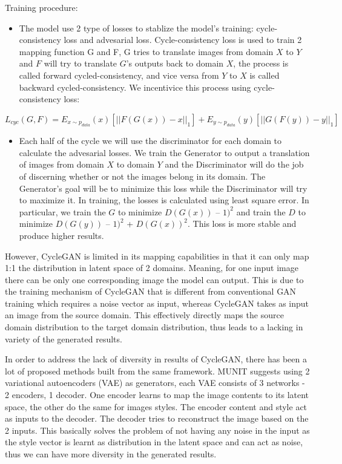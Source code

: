 \documentclass[12pt]{report}
\begin{document}
Training procedure:
\begin{itemize}
	\item The model use 2 type of losses to stablize the model’s training: cycle-consistency loss and advesarial loss. Cycle-consistency loss is used to train 2 mapping function G and F, G tries to translate images from domain $X$ to $Y$ and $F$ will try to translate $G$’s outputs back to domain $X$, the process is called forward cycled-consistency, and vice versa from $Y$ to $X$ is called backward cycled-consistency. We incentivice this process using cycle-consistency loss:
\end{itemize}
\[L_{cyc}(G, F) = E_{x \sim p_{data}}(x)[||F(G(x)) - x||_1] + E_{y \sim p_{data}}(y)[||G(F(y)) - y||_1]\]
\begin{itemize}
	\item Each half of the cycle we will use the discriminator for each domain to calculate the advesarial losses. We train the Generator to output a translation of images from domain $X$ to domain $Y$ and the Discriminator will do the job of discerning whether or not the images belong in its domain. The Generator’s goal will be to minimize this loss while the Discriminator will try to maximize it. In training, the losses is calculated using least square error. In particular, we train the $G$ to minimize $D(G(x))$ – $1)^2$ and train the $D$ to minimize $D(G(y))$ – $1)^2$ + $D(G(x))^2$. This loss is more stable and produce higher results.
\end{itemize}

However, CycleGAN is limited in its mapping capabilities in that it can only map 1:1 the distribution in latent space of 2 domains. Meaning, for one input image there can be only one corresponding image the model can output. This is due to the training mechanism of CycleGAN that is different from conventional GAN training which requires a noise vector as input, whereas CycleGAN takes as input an image from the source domain. This effectively directly maps the source domain distribution to the target domain distribution, thus leads to a lacking in variety of the generated results. 

In order to address the lack of diversity in results of CycleGAN, there has been a lot of proposed methods built from the same framework. MUNIT\cite{munit} suggests using 2 variational autoencoders (VAE) as generators, each VAE consists of 3 networks - 2 encoders, 1 decoder. One encoder learns to map the image contents to its latent space, the other do the same for images styles. The encoder content and style act as inputs to the decoder. The decoder tries to reconstruct the image based on the 2 inputs. This basically solves the problem of not having any noise in the input as the style vector is learnt as distribution in the latent space and can act as noise, thus we can have more diversity in the generated results.
\end{document}
